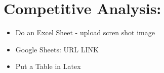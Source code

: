 \section{Competitive Analysis:}
\begin{itemize}
    \item Do an Excel Sheet - upload scren shot image
    \item Google Sheets: URL LINK
    \item Put a Table in Latex
\end{itemize}